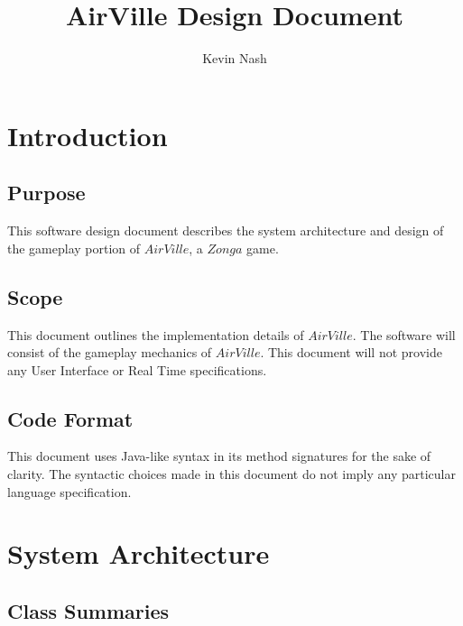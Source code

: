 \documentclass{article}
\author{Kevin Nash}
\title{AirVille Design Document}
\begin{document}
\maketitle

\section{Introduction}

\subsection{Purpose}
This software design document describes the system architecture and design of
the gameplay portion of $AirVille$, a $Zonga$ game.

\subsection{Scope}
This document outlines the implementation details of $AirVille$. The software
will consist of the gameplay mechanics of $AirVille$. This document will not
provide any User Interface or Real Time specifications.

\subsection{Code Format}
This document uses Java-like syntax in its method signatures
for the sake of clarity. The syntactic choices made in this
document do not imply any particular language specification.

\section{System Architecture}

\subsection{Class Summaries}
\end{document}
